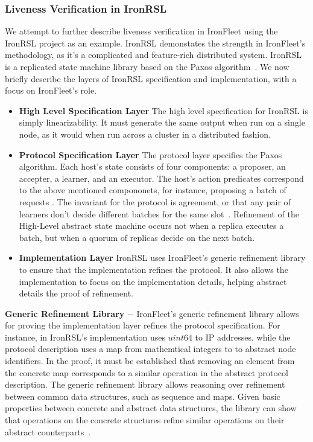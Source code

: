 \documentclass{llncs}
\begin{document}
\subsubsection{Liveness Verification in IronRSL}
We attempt to further describe liveness verification in IronFleet using the IronRSL project as 
an example. IronRSL demonstates the strength in IronFleet's methodology, as it's a 
complicated and feature-rich distributed system. IronRSL is a replicated state machine library
based on the Paxos algorithm~\cite{paxos}. We now briefly describe the layers of IronRSL specification
and implementation, with a focus on IronFleet's role.
\begin{itemize}
\item \textbf{High Level Specification Layer} The high level specification for IronRSL is simply linearizability.
    It must generate the same output when run on a single node, as it would when run across a cluster in a 
    distributed fashion.

\item \textbf{Protocol Specification Layer} The protocol layer specifies the Paxos algorithm. Each host's state 
    consists of four components: a proposer, an accepter, a learner, and an executor. The host's action 
    predicates correspond to the above mentioned compononets, for instance, proposing a batch of requests 
    . The invariant for the protocol is agreement, or that any pair of learners don't 
    decide different batches for the same slot~\cite{ironfleet}. Refinement of the High-Level abstract state machine
    occurs not when a replica executes a batch, but when a quorum of replicas decide on the next batch.

\item \textbf{Implementation Layer} IronRSL uses IronFleet's generic refinement library to ensure that 
    the implementation refines the protocol. It also allows the implementation to focus on the implementation
    details, helping abstract details the proof of refinement.    

\end{itemize}


\textbf{Generic Refinement Library} $-$ IronFleet's generic refinement library allows for proving the implementation 
layer refines the protocol specification. For instance, in IronRSL's implementation uses $uint64$ to 
IP addresses, while the protocol description uses a map from mathemtical integers to to abstract node identifiers.
In the proof, it must be established that removing an element from the concrete map corresponds to a similar 
operation in the abstract protocol description. The generic refinement library allows reasoning over 
refinement between common data structures, such as sequence and maps. Given basic properties between concrete and
abstract data structures, the library can show that operations on the concrete structures refine similar operations
on their abstract counterparts~\cite{ironfleet}.
\end{document}
